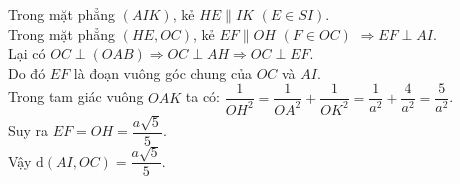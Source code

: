 \begin{vd}
{\begin{enumerate}
			Trong mặt phẳng $(AIK)$, kẻ $HE \parallel IK$ $(E \in SI)$.\\
			Trong mặt phẳng $(HE, OC)$, kẻ $EF \parallel OH$ $(F \in OC)$ $\Rightarrow EF \perp AI$.\\
			Lại có $OC \perp (OAB) \Rightarrow OC \perp AH \Rightarrow OC \perp EF$.\\
			Do đó $EF$ là đoạn vuông góc chung của $OC$ và $AI$.\\
			Trong tam giác vuông $OAK$ ta có: $\dfrac{1}{OH^2} = \dfrac{1}{OA^2} + \dfrac{1}{OK^2} = \dfrac{1}{a^2} + \dfrac{4}{a^2} = \dfrac{5}{a^2}$.\\
			Suy ra $EF = OH = \dfrac{a\sqrt{5}}{5}$.\\
			Vậy $\mathrm{d}(AI, OC) = \dfrac{a\sqrt{5}}{5}$.
		\end{enumerate}
	}
\end{vd}

